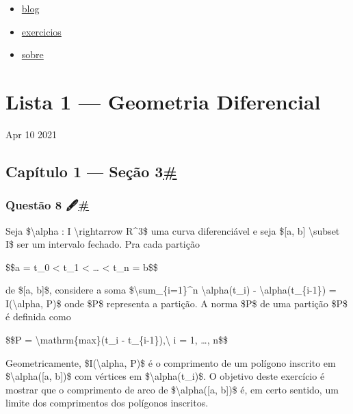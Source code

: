 \begin{itemize}
\tightlist
\item
  \href{/blog}{blog}
\item
  \href{/exercicios}{exercicios}
\item
  \href{/}{sobre}
\end{itemize}

\hypertarget{post__title}{%
\section{Lista 1 --- Geometria Diferencial}\label{post__title}}

Apr 10 2021

\hypertarget{capuxedtulo-1--seuxe7uxe3o-3}{%
\subsection{\texorpdfstring{Capítulo 1 --- Seção
3\protect\hyperlink{capuxedtulo-1--seuxe7uxe3o-3}{\#}}{Capítulo 1 --- Seção 3\#}}\label{capuxedtulo-1--seuxe7uxe3o-3}}

\hypertarget{questuxe3o-8-}{%
\subsubsection{\texorpdfstring{Questão 8
🖋️\protect\hyperlink{questuxe3o-8-}{\#}}{Questão 8 🖋️\#}}\label{questuxe3o-8-}}

Seja \$\textbackslash{}alpha : I \textbackslash{}rightarrow R\^{}3\$ uma
curva diferenciável e seja \${[}a, b{]} \textbackslash{}subset I\$ ser
um intervalo fechado. Pra cada partição

\$\$a = t\_0 \textless{} t\_1 \textless{} \ldots{} \textless{} t\_n =
b\$\$

de \${[}a, b{]}\$, considere a soma \$\textbackslash{}sum\_\{i=1\}\^{}n
\textbar{}\textbackslash{}alpha(t\_i) -
\textbackslash{}alpha(t\_\{i-1\})\textbar{} = I(\textbackslash{}alpha,
P)\$ onde \$P\$ representa a partição. A norma \$\textbar{}P\textbar{}\$
de uma partição \$\textbar{}P\textbar{}\$ é definida como

\$\$\textbar{}P\textbar{} = \textbackslash{}mathrm\{max\}(t\_i -
t\_\{i-1\}),\textbackslash{} i = 1, \ldots{}, n\$\$

Geometricamente, \$I(\textbackslash{}alpha, P)\$ é o comprimento de um
polígono inscrito em \$\textbackslash{}alpha({[}a, b{]})\$ com vértices
em \$\textbackslash{}alpha(t\_i)\$. O objetivo deste exercício é mostrar
que o comprimento de arco de \$\textbackslash{}alpha({[}a, b{]})\$ é, em
certo sentido, um limite dos comprimentos dos polígonos inscritos.

